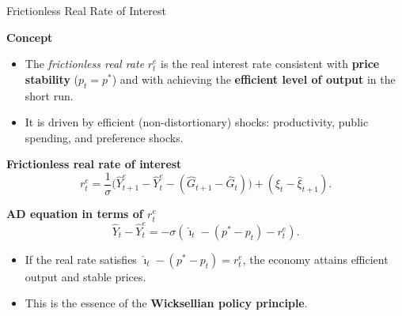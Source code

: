\documentclass[11pt,aspectratio=169]{beamer}
\begin{document}
\begin{frame}{Frictionless Real Rate of Interest}
\small

\textbf{Concept}
\begin{itemize}
    \item The \emph{frictionless real rate} $r_t^{e}$ is the real interest rate
          consistent with \textbf{price stability} ($p_t = p^{\ast}$)
          and with achieving the \textbf{efficient level of output} in the short run.
    \item It is driven by efficient (non-distortionary) shocks: productivity, public spending, and preference shocks.
\end{itemize}

\vspace{0.25cm}

\textbf{Frictionless real rate of interest}
\[
r^e_t =
\frac{1}{\sigma}
\Big(\hat{Y}^e_{t+1}-\hat{Y}^e_t - (\hat{G}_{t+1}-\hat{G}_t)\Big)
+ (\hat{\xi}_t - \hat{\xi}_{t+1}).
\]

\vspace{0.2cm}

\textbf{AD equation in terms of $r_t^{e}$}
\[
\hat{Y}_t - \hat{Y}_t^{e}
=
-\sigma\left(\hat{\imath}_t - (p^{\ast}-p_t) - r_t^{e}\right).
\]

\begin{itemize}
    \item If the real rate satisfies  
          $\hat{\imath}_t - (p^{\ast}-p_t)=r_t^{e}$,  
          the economy attains efficient output and stable prices.
    \item This is the essence of the \textbf{Wicksellian policy principle}.
\end{itemize}

\end{frame}
\end{document}
